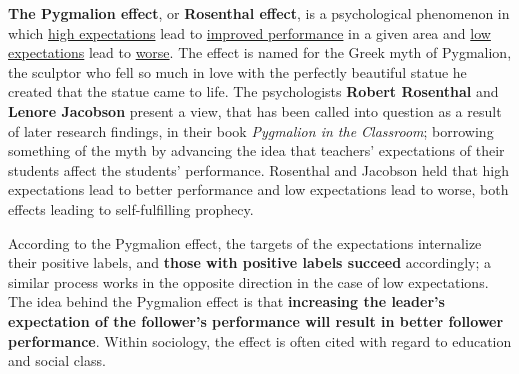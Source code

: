 \hspace{\parindent}\textbf{The Pygmalion effect}, or \textbf{Rosenthal effect}, is a psychological phenomenon in which \underline{high expectations} lead to \underline{improved performance} in a given area and \underline{low expectations} lead to \underline{worse}. The effect is named for the Greek myth of Pygmalion, the sculptor who fell so much in love with the perfectly beautiful statue he created that the statue came to life. The psychologists \textbf{Robert Rosenthal} and \textbf{Lenore Jacobson} present a view, that has been called into question as a result of later research findings, in their book \textit{Pygmalion in the Classroom}; borrowing something of the myth by advancing the idea that teachers' expectations of their students affect the students' performance. Rosenthal and Jacobson held that high expectations lead to better performance and low expectations lead to worse, both effects leading to self-fulfilling prophecy.

\hspace{\parindent}According to the Pygmalion effect, the targets of the expectations internalize their positive labels, and \textbf{those with positive labels succeed} accordingly; a similar process works in the opposite direction in the case of low expectations. The idea behind the Pygmalion effect is that \textbf{increasing the leader's expectation of the follower's performance will result in better follower performance}. Within sociology, the effect is often cited with regard to education and social class. 